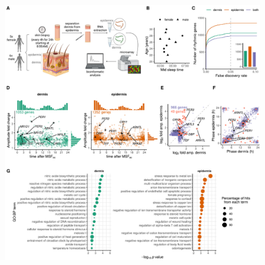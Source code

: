 \begin{figure}[b!]
	\begin{center}
		\includegraphics[scale=0.55]{./Figures/fig1_complete.pdf}

\end{center}
\end{figure}
